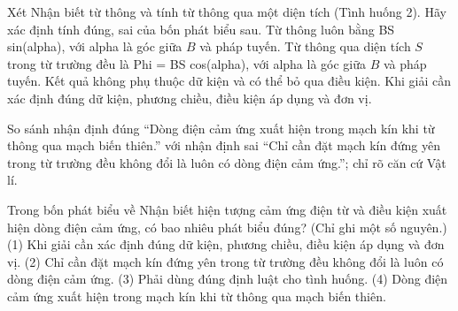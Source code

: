 \begin{ex}
Xét Nhận biết từ thông và tính từ thông qua một diện tích (Tình huống 2). Hãy xác định tính đúng, sai của bốn phát biểu sau.
\choiceTF
{Từ thông luôn bằng BS sin(alpha), với alpha là góc giữa $B$ và pháp tuyến.}
{\True Từ thông qua diện tích $S$ trong từ trường đều là Phi = BS cos(alpha), với alpha là góc giữa $B$ và pháp tuyến.}
{Kết quả không phụ thuộc dữ kiện và có thể bỏ qua điều kiện.}
{\True Khi giải cần xác định đúng dữ kiện, phương chiều, điều kiện áp dụng và đơn vị.}
\end{ex}

\begin{bt}
So sánh nhận định đúng “Dòng điện cảm ứng xuất hiện trong mạch kín khi từ thông qua mạch biến thiên.” với nhận định sai “Chỉ cần đặt mạch kín đứng yên trong từ trường đều không đổi là luôn có dòng điện cảm ứng.”; chỉ rõ căn cứ Vật lí.
\end{bt}

\begin{ex}
Trong bốn phát biểu về Nhận biết hiện tượng cảm ứng điện từ và điều kiện xuất hiện dòng điện cảm ứng, có bao nhiêu phát biểu đúng? (Chỉ ghi một số nguyên.) (1) Khi giải cần xác định đúng dữ kiện, phương chiều, điều kiện áp dụng và đơn vị. (2) Chỉ cần đặt mạch kín đứng yên trong từ trường đều không đổi là luôn có dòng điện cảm ứng. (3) Phải dùng đúng định luật cho tình huống. (4) Dòng điện cảm ứng xuất hiện trong mạch kín khi từ thông qua mạch biến thiên.
\end{ex}

